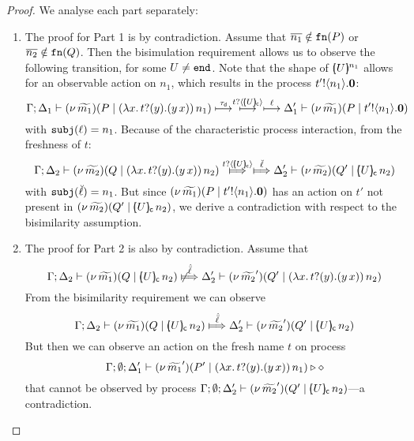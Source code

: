 \begin{proof}
We analyse each part separately:
	\begin{enumerate}[1.]
		\item	The proof for Part 1 is  by contradiction.
				Assume that $\overline{n_1} \notin \mathtt{fn}(P)$ or $\overline{n_2} \notin \mathtt{fn}(Q)$.
				Then the bisimulation requirement allows us to observe the following transition, for some $U \not= \mathtt{end}$.
				Note that the shape of $[\!\!(U)\!\!]^{n_1}$ allows for an observable action on $n_1$, which 
				results in the process $t' ! \langle n_1 \rangle . \mathbf{0}$:
				\[
					\Gamma; \Delta_1 \vdash (\nu\, \widetilde{m_1})(P \;|\; (\lambda x.\,t ? (y) . (y\, {x}))\, {n_1} )  \stackrel{\tau_{\mathsf{d}}}{\longmapsto} \stackrel{ t ? \langle [\!\!(U)\!\!]_{\mathsf{c}} \rangle  }{\longmapsto} \stackrel{\ell}{\longmapsto}  \Delta_1' \vdash (\nu\, \widetilde{m_1})(P \;|\; t' ! \langle n_1 \rangle . \mathbf{0} )
				\]
				with $\mathtt{subj}(\ell) = n_1$. Because of the characteristic process interaction,
			  from the freshness of $t$:
				\[
					\horel{\Gamma}{\Delta_2}{\newsp{\widetilde{m_2}}{Q \Par \appl{(\trvalx{t})}{n_2} }}
					{ \Hby{ \bactinp{t}{\omapchar{U}}  } \Hby{\mact{\ell}} }
					{\Delta_2'}{\newsp{\widetilde{m_2}}{Q' \Par \appl{\omapchar{U}}{n_2}}}
				\]
				with $\mathtt{subj}(\breve{\ell}) = n_1$. %
				But since 
				$(\nu\, \widetilde{m_1})(P \;|\; t' ! \langle n_1 \rangle . \mathbf{0} )$ has an action on $t'$ 
				not present in $(\nu\, \widetilde{m_2})(Q' \;|\; [\!\!(U)\!\!]_{\mathsf{c}}\, {n_2})$, we derive a contradiction with respect to the bisimilarity assumption.

		\item	The proof for Part 2 is also  by contradiction. Assume that
				\[
					\horel{\Gamma}{\Delta_2}{\newsp{\widetilde{m_1}}{Q \Par \appl{\omapchar{U}}{n_2} }} %
					{\not\Hby{\hat{\mact{\ell}}}}
					{\Delta_2'}{\newsp{\widetilde{m_2}'}{Q' \Par \appl{(\trvalx{t})}{n_2} }} %
				\]
				From the bisimilarity requirement we can observe
				\[
					\horel{\Gamma}{\Delta_2}{\newsp{\widetilde{m_1}}{Q \Par \appl{\omapchar{U}}{n_2} }} %
					{\Hby{\hat{\mact{\ell}}}}
					{\Delta_2'}{\newsp{\widetilde{m_2}'}{Q' \Par \appl{\omapchar{U}}{n_2} }} %
				\]
				But then we can observe an action on the fresh name $t$ on process
				\[
					\Gamma; \emptyset; \Delta_1' \vdash (\nu\, \widetilde{m_1}')(P' \;|\; (\lambda x.\,t ? (y) . (y\, {x}))\, {n_1} ) \triangleright \diamond
				\]
				that cannot be observed by process
				$
					\Gamma; \emptyset; \Delta_2' \vdash (\nu\, \widetilde{m_2}')(Q' \;|\; [\!\!(U)\!\!]_{\mathsf{c}}\, {n_2} )
				$---a contradiction.


\end{enumerate}
\end{proof}
